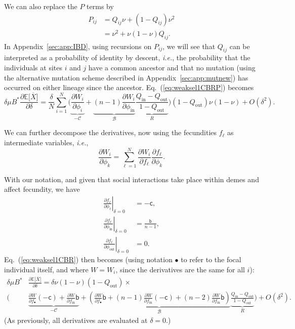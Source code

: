 \documentclass[11pt, letterpaper]{article}
\newcommand{\Eqref}[1]{Eq.~(\ref{#1})}
\newcommand{\ie}{\textit{i.e.}}
\newcommand{\deriv}[2]{\partial_{#2}\!{#1}\,}
\newcommand{\derivv}[3]{\left.\frac{\partial #1}{\partial #2}\right |_{#3=0}} %
\newcommand{\derivn}[2]{\frac{\partial #1}{\partial #2}}
\newcommand{\Esp}[1]{\mathbb{E}\big[ #1\big]}%
\newcommand{\bigO}[1]{O\left( #1 \right)}
\newcommand{\appname}[0]{Appendix}
\newcommand{\bb}{\mathsf{b}}
\newcommand{\cc}{\mathsf{c}}
\newcommand{\mutbias}{\nu}
\newcommand{\inn}{\textrm{in}}
\newcommand{\out}{\textrm{out}}
\newcommand{\focal}{\bullet}
\newcommand{\selstr}{\delta}
\begin{document}
We can also replace the $P$ terms by 
\begin{equation}\label{eq:QP}
\begin{split}
P_{ij} &= Q_{ij} \mutbias + (1-Q_{ij}) \mutbias^2\\
&= \mutbias^2 + \mutbias (1-\mutbias) Q_{ij}.
\end{split}
\end{equation}
%
In \appname~\ref{sec:app:IBD}, using recursions on $P_{ij}$, we will see that $Q_{ij}$ can be interpreted as a probability of identity by descent, \ie, the probability that the individuals at sites $i$ and $j$ have a common ancestor and that no mutation (using the alternative mutation scheme described in \appname~\ref{sec:app:mutnew}) has occurred on either lineage since the ancestor. \Eqref{eq:weaksel1CBRP} becomes
%
\begin{equation}\label{eq:weaksel1CBR}
\selstr \mu B^* \derivn{\Esp{\overline{X}}}{\selstr} = \frac{\selstr}{N} \sum_{i=1}^N \Bigg( \underbrace{\derivn{W_i}{\phi_i}}_{-\mathcal{C}} + \underbrace{(n-1) \derivn{W_i}{\phi_{\inn}}}_{\mathcal{B}} \underbrace{\frac{Q_{\inn} - Q_{\out}}{1 - Q_{\out}}}_{R} \Bigg) (1 - Q_{\out}) \mutbias (1-\mutbias) + \bigO{\selstr^2}.
\end{equation}
%

We can further decompose the derivatives, now using the fecundities $f_{\ell}$ as intermediate variables, \ie,
\begin{equation}
\derivn{W_i}{\phi_k} = \sum_{\ell =1}^N \derivn{W_i}{f_{\ell}} \derivn{f_{\ell}}{\phi_k}.
\end{equation}

With our notation, and given that social interactions take place within demes and affect fecundity, we have
\begin{subequations}\label{eq:derivf}
\begin{align}
\derivv{f_{\ell}}{\phi_{\ell}}{\selstr} & = -\cc,\\
\derivv{f_{\ell}}{\phi_{\inn}}{\selstr} & = \frac{\bb}{n-1},\\
\derivv{f_{\ell}}{\phi_{\out}}{\selstr} & = 0.
\end{align}
\end{subequations}
%
\Eqref{eq:weaksel1CBR} then becomes (using notation $\focal$ to refer to the focal individual itself, and where $W=W_i$, since the derivatives are the same for all $i$):
%
\begin{equation}\label{eq:weaksel2}
\begin{split}
\selstr \mu B^* & \derivn{\Esp{\overline{X}}}{\selstr} = \selstr  \mutbias (1-\mutbias) (1 - Q_{\out}) \times \\
 \Bigg( &\underbrace{ \derivn{W}{f_{\focal}} (-\cc) + \derivn{W}{f_{\inn}} \bb}_{-\mathcal{C}} + \underbrace{ \left( \derivn{W}{f_{\focal}} \bb + (n-1) \derivn{W}{f_{\inn}} (-\cc) + (n-2) \derivn{W}{f_{\inn}} \bb \right) }_{\mathcal{B}} \underbrace{\frac{Q_{\inn} - Q_{\out}}{1 - Q_{\out}}}_{R} \Bigg)  + \bigO{\selstr^2}.
\end{split}
\end{equation}
%
(As previously, all derivatives are evaluated at $\selstr = 0$.)
\end{document}

